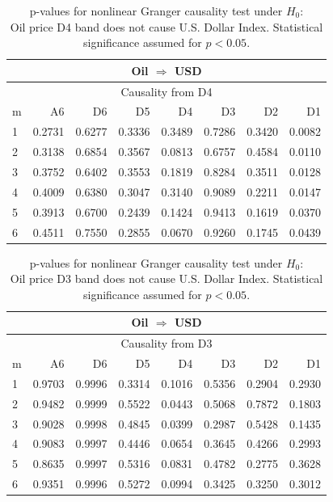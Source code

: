 %
%
\begin{table}[H]
\begin{center}
\begin{tabular}{l|r r r r r r r}
\hline\hline
\multicolumn{8}{c}{Oil $\Rightarrow$ USD}\\
\hline
\multicolumn{8}{c}{Causality from D4}\\
\hline\hline
m & A6 & D6 & D5 & D4 & D3 & D2 & D1 \\
\hline
1 & 0.2731 & 0.6277 & 0.3336 & 0.3489 & 0.7286 & 0.3420 & \cellcolor{mygreen}0.0082 \\
2 & 0.3138 & 0.6854 & 0.3567 & 0.0813 & 0.6757 & 0.4584 & \cellcolor{mygreen}0.0110 \\
3 & 0.3752 & 0.6402 & 0.3553 & 0.1819 & 0.8284 & 0.3511 & \cellcolor{mygreen}0.0128 \\
4 & 0.4009 & 0.6380 & 0.3047 & 0.3140 & 0.9089 & 0.2211 & \cellcolor{mygreen}0.0147 \\
5 & 0.3913 & 0.6700 & 0.2439 & 0.1424 & 0.9413 & 0.1619 & \cellcolor{mygreen}0.0370 \\
6 & 0.4511 & 0.7550 & 0.2855 & 0.0670 & 0.9260 & 0.1745 & \cellcolor{mygreen}0.0439 \\
\hline\hline
\end{tabular}
\caption{p-values for nonlinear Granger causality test under $H_0$:\\
Oil price D4 band does not cause U.S. Dollar Index. Statistical significance assumed for $p<0.05$.}
\end{center}
\end{table}

%
%
\begin{table}[H]
\begin{center}
\begin{tabular}{l|r r r r r r r}
\hline\hline
\multicolumn{8}{c}{Oil $\Rightarrow$ USD}\\
\hline
\multicolumn{8}{c}{Causality from D3}\\
\hline\hline
m & A6 & D6 & D5 & D4 & D3 & D2 & D1 \\
\hline
1 & 0.9703 & 0.9996 & 0.3314 & 0.1016 & 0.5356 & 0.2904 & 0.2930 \\
2 & 0.9482 & 0.9999 & 0.5522 & \cellcolor{mygreen}0.0443 & 0.5068 & 0.7872 & 0.1803 \\
3 & 0.9028 & 0.9998 & 0.4845 & \cellcolor{mygreen}0.0399 & 0.2987 & 0.5428 & 0.1435 \\
4 & 0.9083 & 0.9997 & 0.4446 & 0.0654 & 0.3645 & 0.4266 & 0.2993 \\
5 & 0.8635 & 0.9997 & 0.5316 & 0.0831 & 0.4782 & 0.2775 & 0.3628 \\
6 & 0.9351 & 0.9996 & 0.5272 & 0.0994 & 0.3425 & 0.3250 & 0.3012 \\
\hline\hline
\end{tabular}
\caption{p-values for nonlinear Granger causality test under $H_0$:\\
Oil price D3 band does not cause U.S. Dollar Index. Statistical significance assumed for $p<0.05$.}
\end{center}
\end{table}


